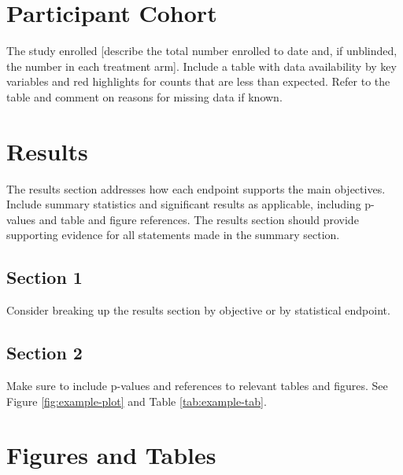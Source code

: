\documentclass[11pt]{article}
\begin{document}
\hypertarget{participant-cohort}{%
\section{Participant Cohort}\label{participant-cohort}}

The study enrolled {[}describe the total number enrolled to date and, if unblinded,
the number in each treatment arm{]}.
Include a table with data availability by key variables and red highlights for
counts that are less than expected.
Refer to the table and comment on reasons for missing data if known.

\hypertarget{results}{%
\section{Results}\label{results}}

The results section addresses how each endpoint supports the main objectives.
Include summary statistics and significant results as applicable,
including p-values and table and figure references.
The results section should provide supporting evidence for all statements made
in the summary section.

\hypertarget{section-1}{%
\subsection{Section 1}\label{section-1}}

Consider breaking up the results section by objective or by statistical endpoint.

\hypertarget{section-2}{%
\subsection{Section 2}\label{section-2}}

Make sure to include p-values and references to relevant tables and figures.
See Figure \ref{fig:example-plot} and Table \ref{tab:example-tab}.

\clearpage

\hypertarget{figures-and-tables}{%
\section{Figures and Tables}\label{figures-and-tables}}
\end{document}
